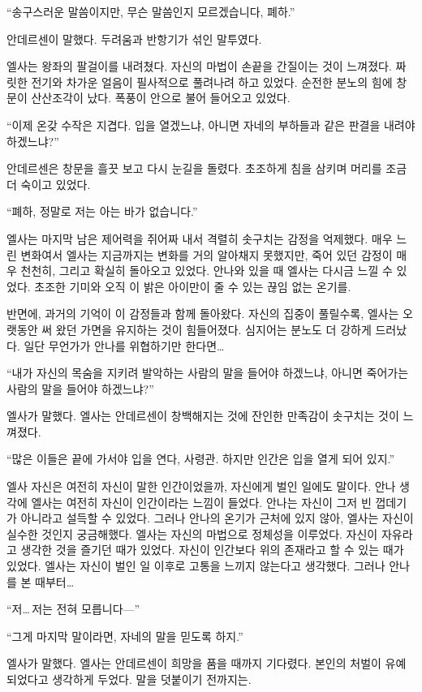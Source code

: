 ``송구스러운 말씀이지만, 무슨 말씀인지 모르겠습니다, 폐하.''

안데르센이 말했다. 두려움과 반항기가 섞인 말투였다.

엘사는 왕좌의 팔걸이를 내려쳤다. 자신의 마법이 손끝을 간질이는 것이 느껴졌다. 짜릿한 전기와 차가운 얼음이 필사적으로 풀려나려 하고 있었다. 순전한 분노의 힘에 창문이 산산조각이 났다. 폭풍이 안으로 불어 들어오고 있었다.

``이제 온갖 수작은 지겹다. 입을 열겠느냐, 아니면 자네의 부하들과 같은 판결을 내려야 하겠느냐?''

안데르센은 창문을 흘끗 보고 다시 눈길을 돌렸다. 초조하게 침을 삼키며 머리를 조금 더 숙이고 있었다.

``폐하, 정말로 저는 아는 바가 없습니다.''

엘사는 마지막 남은 제어력을 쥐어짜 내서 격렬히 솟구치는 감정을 억제했다. 매우 느린 변화여서 엘사는 지금까지는 변화를 거의 알아채지 못했지만, 죽어 있던 감정이 매우 천천히, 그리고 확실히 돌아오고 있었다. 안나와 있을 때 엘사는 다시금 느낄 수 있었다. 초조한 기미와 오직 이 밝은 아이만이 줄 수 있는 끊임 없는 온기를. 

반면에, 과거의 기억이 이 감정들과 함께 돌아왔다. 자신의 집중이 풀릴수록, 엘사는 오랫동안 써 왔던 가면을 유지하는 것이 힘들어졌다. 심지어는 분노도 더 강하게 드러났다. 일단 무언가가 안나를 위협하기만 한다면\ldots

``내가 자신의 목숨을 지키려 발악하는 사람의 말을 들어야 하겠느냐, 아니면 죽어가는 사람의 말을 들어야 하겠느냐?''

엘사가 말했다. 엘사는 안데르센이 창백해지는 것에 잔인한 만족감이 솟구치는 것이 느껴졌다.

``많은 이들은 끝에 가서야 입을 연다, 사령관. 하지만 인간은 입을 열게 되어 있지.''

엘사 자신은 여전히 자신이 말한 인간이었을까, 자신에게 벌인 일에도 말이다. 안나 생각에 엘사는 여전히 자신이 인간이라는 느낌이 들었다. 안나는 자신이 그저 빈 껍데기가 아니라고 설득할 수 있었다. 그러나 안나의 온기가 근처에 있지 않아, 엘사는 자신이 실수한 것인지 궁금해했다. 엘사는 자신의 마법으로 정체성을 이루었다. 자신이 자유라고 생각한 것을 즐기던 때가 있었다. 자신이 인간보다 위의 존재라고 할 수 있는 때가 있었다. 엘사는 자신이 벌인 일 이후로 고통을 느끼지 않는다고 생각했다. 그러나 안나를 본 때부터\ldots

``저\ldots\,저는 전혀 모릅니다—''

``그게 마지막 말이라면, 자네의 말을 믿도록 하지.''

엘사가 말했다. 엘사는 안데르센이 희망을 품을 때까지 기다렸다. 본인의 처벌이 유예되었다고 생각하게 두었다. 말을 덧붙이기 전까지는.


